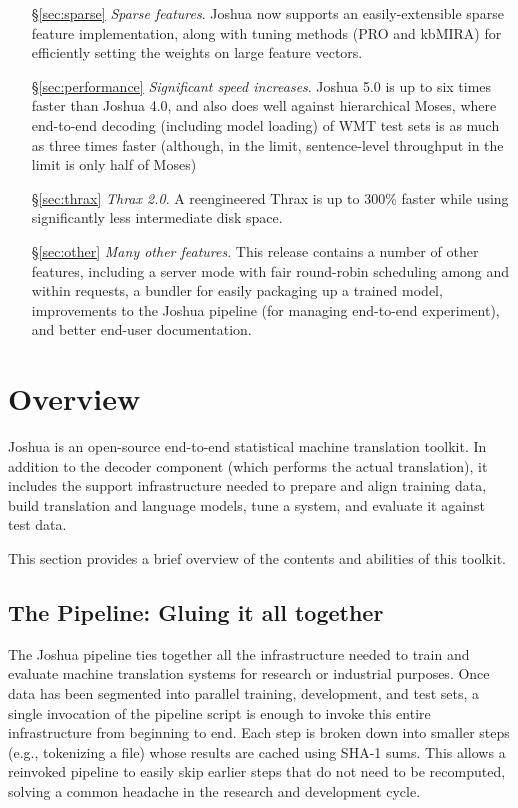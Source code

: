 \documentclass[11pt]{article}
\begin{document}
\begin{itemize}
  \item[\S\ref{sec:sparse}] \emph{Sparse features}. Joshua now supports an
    easily-extensible sparse feature implementation, along with tuning
    methods (PRO and kbMIRA) for efficiently setting the weights on
    large feature vectors.
  \item[\S\ref{sec:performance}] \emph{Significant speed
    increases}. Joshua 5.0 is up to six times faster than Joshua 4.0,
    and also does well against hierarchical Moses, where end-to-end
    decoding (including model loading) of WMT test sets is as much as
    three times faster (although, in the limit, sentence-level
    throughput in the limit is only half of Moses)
  \item[\S\ref{sec:thrax}] \emph{Thrax 2.0}. A reengineered Thrax is
    up to 300\% faster while using significantly less intermediate
    disk space.
  \item[\S\ref{sec:other}] \emph{Many other features}. This release
    contains a number of other features, including a server mode with
    fair round-robin scheduling among and within requests, a bundler
    for easily packaging up a trained model, improvements to the
    Joshua pipeline (for managing end-to-end experiment), and better
    end-user documentation.
\end{itemize}

\section{Overview}

Joshua is an open-source end-to-end statistical machine translation
toolkit. In addition to the decoder component (which performs the
actual translation), it includes the support infrastructure needed to
prepare and align training data, build translation and language
models, tune a system, and evaluate it against test data. 

This section provides a brief overview of the contents and abilities
of this toolkit.

\subsection{The Pipeline: Gluing it all together}

The Joshua pipeline ties together all the infrastructure needed to
train and evaluate machine translation systems for research or
industrial purposes. Once data has been segmented into parallel
training, development, and test sets, a single invocation of the
pipeline script is enough to invoke this entire infrastructure from
beginning to end. Each step is broken down into smaller steps (e.g.,
tokenizing a file) whose results are cached using SHA-1 sums. This
allows a reinvoked pipeline to easily skip earlier steps that do not
need to be recomputed, solving a common headache in the research and
development cycle.
\end{document}
